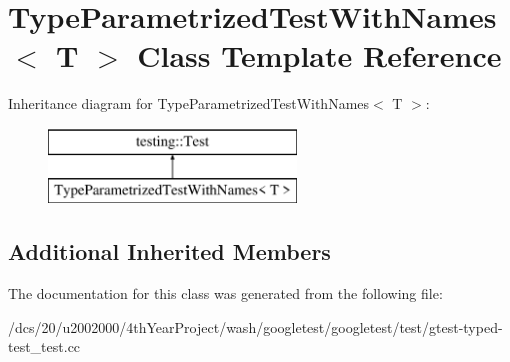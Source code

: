 \hypertarget{classTypeParametrizedTestWithNames}{}\section{Type\+Parametrized\+Test\+With\+Names$<$ T $>$ Class Template Reference}
\label{classTypeParametrizedTestWithNames}
Inheritance diagram for Type\+Parametrized\+Test\+With\+Names$<$ T $>$\+:\begin{figure}[H]
\begin{center}
\leavevmode
\includegraphics[height=2.000000cm]{classTypeParametrizedTestWithNames}
\end{center}
\end{figure}
\subsection*{Additional Inherited Members}


The documentation for this class was generated from the following file\+:\begin{DoxyCompactItemize}
\item 
/dcs/20/u2002000/4th\+Year\+Project/wash/googletest/googletest/test/gtest-\/typed-\/test\+\_\+test.\+cc\end{DoxyCompactItemize}
